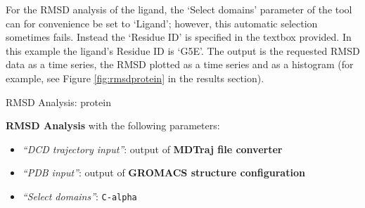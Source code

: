 \documentclass[twocolumn]{bmcart}%
\providecommand{\tightlist}{%
  \setlength{\itemsep}{0pt}\setlength{\parskip}{0pt}}
\begin{document}
For the RMSD analysis of the ligand, the `Select domains' parameter of the tool can for convenience be set to `Ligand'; however, this automatic selection sometimes fails. Instead the `Residue ID' is specified in the textbox provided. In this example the ligand's Residue ID is `G5E'. The output is the requested RMSD data as a time series, the RMSD plotted as a time series and as a histogram (for example, see Figure \ref{fig:rmsdprotein} in the results section).

\begin{handson_box_colour}{RMSD Analysis: protein}

  \textbf{RMSD Analysis} with the following parameters:

  \begin{itemize}
  \tightlist
    \item
    \emph{``DCD trajectory input''}: output of
    \textbf{MDTraj file converter}
  \item
    \emph{``PDB input''}: output of \textbf{GROMACS
    structure configuration}
  \item
    \emph{``Select domains''}: \texttt{C-alpha}
  \end{itemize}

\end{handson_box_colour}


\end{document}
